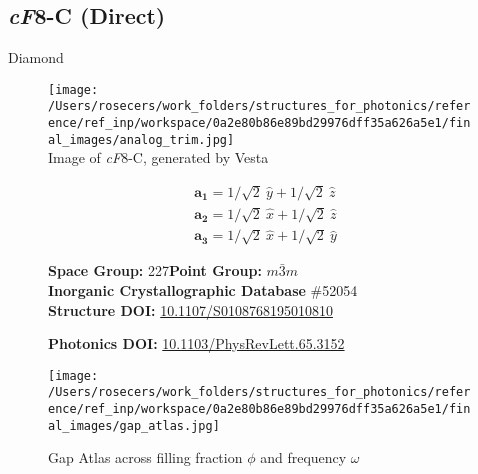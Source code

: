 \subsection{\large{\textit{cF}8-C (Direct)}}\vspace{-0.1in}
Diamond


\begin{figure}[H]
\begin{minipage}{0.34\textwidth}\centering
\texttt{[image: /Users/rosecers/work\_folders/structures\_for\_photonics/reference/ref\_inp/workspace/0a2e80b86e89bd29976dff35a626a5e1/final\_images/analog\_trim.jpg]}\\
\small{Image of \textit{cF}8-C, generated by Vesta}
\end{minipage}\hfill
\begin{minipage}{0.65\textwidth}\raggedright
{\setlength{\mathindent}{0cm}
\begin{equation*}
\begin{split}&\boldsymbol{a_1} = 1/\sqrt{2}\ \hat{y} + 1/\sqrt{2}\ \hat{z}\\[-8pt]
&\boldsymbol{a_2} = 1/\sqrt{2}\ \hat{x} + 1/\sqrt{2}\ \hat{z}\\[-8pt]
&\boldsymbol{a_3} = 1/\sqrt{2}\ \hat{x} + 1/\sqrt{2}\ \hat{y}
\end{split}
\end{equation*}}

\textbf{Space Group:}	227\hspace{0.5in}\textbf{Point Group:}	$m\bar{3}m$\\
\textbf{Inorganic Crystallographic Database} \#52054\\
\textbf{Structure DOI: }\url{10.1107/S0108768195010810}

\textbf{Photonics DOI: }\url{10.1103/PhysRevLett.65.3152}
\end{minipage}\hfill
\end{figure}
\vspace{-0.25in}


\begin{figure}[H]
\begin{minipage}{0.9\textwidth}\centering
\texttt{[image: /Users/rosecers/work\_folders/structures\_for\_photonics/reference/ref\_inp/workspace/0a2e80b86e89bd29976dff35a626a5e1/final\_images/gap\_atlas.jpg]}
\\
\end{minipage}\hfill\caption{Gap Atlas across filling fraction $\phi$ and frequency $\omega$}
\end{figure}


